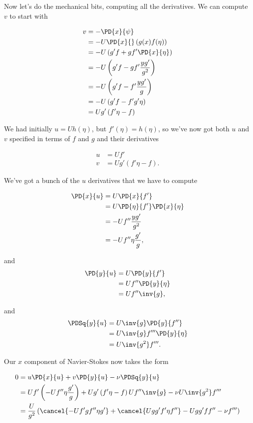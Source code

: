 Now let's do the mechanical bits, computing all the derivatives.  We can compute $v$ to start with

\begin{align*}
v 
&= -\PD{x}{\psi} \\
&= - U \PD{x}{} \left( g(x) f(\eta) \right) \\
&= - U \left( g' f + g f' \PD{x}{\eta} \right) \\
&= - U \left( g' f - g f' \frac{y g'}{g^2} \right) \\
&= - U \left( g' f - f' \frac{y g'}{g} \right) \\
&= - U \left( g' f - f' g' \eta \right) \\
&= U g' \left( f' \eta - f \right)
\end{align*}

We had initially $u = U h(\eta)$, but $f'(\eta) = h(\eta)$, so we've now got both $u$ and $v$ specified in terms of $f$ and $g$ and their derivatives

\begin{align}\label{eqn:continuumL19:890}
u &= U f' \\
v &= U g' \left( f' \eta - f \right).
\end{align}

We've got a bunch of the $u$ derivatives that we have to compute

\begin{align*}
\PD{x}{u} 
&=
U \PD{x}{ f' } \\
&=
U \PD{\eta}{ f' } \PD{x}{\eta} \\
&=
-U f'' \frac{y g'}{g^2} \\
&=
-U f'' \eta \frac{g'}{g},
\end{align*}

and
\begin{align*}
\PD{y}{u} 
&=
U \PD{y}{ f' } \\
&=
U f'' \PD{y}{\eta} \\
&=
U f'' \inv{g},
\end{align*}

and
\begin{align*}
\PDSq{y}{u} 
&=
U \inv{g} \PD{y}{f''} \\
&=
U \inv{g} f''' \PD{y}{\eta} \\
&=
U \inv{g^2} f'''.
\end{align*}

Our $x$ component of Navier-Stokes now takes the form

\begin{align*}
0 &=
u \PD{x}{u}
+
v \PD{y}{u}
-
\nu 
\PDSq{y}{u} \\
&=
U f' \left( 
-U f'' \eta \frac{g'}{g}
\right)
+
U g' \left( f' \eta - f \right)
U f'' \inv{g}
- 
\nu
U \inv{g^2} f''' \\
&=
\frac{U}{g^2}
\left( 
\cancel{-U f' g f'' \eta g' }
+
\cancel{U g g' f' \eta f''}
-
U g g' f f'' 
- 
\nu
f'''
\right)
\end{align*}

